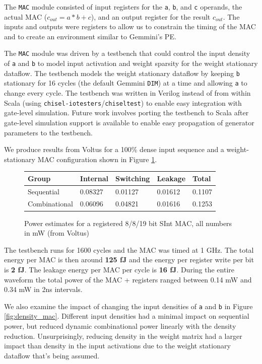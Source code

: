 \documentclass[sigconf]{acmart}
\begin{document}
The \texttt{MAC} module consisted of input registers for the \texttt{a}, \texttt{b}, and \texttt{c} operands, the actual MAC ($c_{out} = a*b + c$), and an output register for the result $c_{out}$.
The inputs and outputs were registers to allow us to constrain the timing of the MAC and to create an environment similar to Gemmini's PE.

The \texttt{MAC} module was driven by a testbench that could control the input density of \texttt{a} and \texttt{b} to model input activation and weight sparsity for the weight stationary dataflow.
The testbench models the weight stationary dataflow by keeping \texttt{b} stationary for 16 cycles (the default Gemmini \texttt{DIM}) at a time and allowing \texttt{a} to change every cycle.
The testbench was written in Verilog instead of from within Scala (using \texttt{chisel-iotesters}/\texttt{chiseltest}) to enable easy integration with gate-level simulation.
Future work involves porting the testbench to Scala after gate-level simulation support is available to enable easy propagation of generator parameters to the testbench.

We produce results from Voltus for a 100\% dense input sequence and a weight-stationary MAC configuration shown in Figure \ref{fig:mac_energy}.

\begin{figure}
\begin{tabular}{l l l l l}
  \toprule
  \textbf{Group} & \textbf{Internal} & \textbf{Switching} & \textbf{Leakage} & \textbf{Total} \\ \midrule
  Sequential & 0.08327 & 0.01127 & 0.01612 & 0.1107 \\
  Combinational & 0.06096 & 0.04821 & 0.01616 & 0.1253 \\
  \bottomrule
\end{tabular}
\caption{Power estimates for a registered 8/8/19 bit SInt MAC, all numbers in mW (from Voltus)}
\label{fig:mac_energy}
\end{figure}

The testbench runs for 1600 cycles and the MAC was timed at 1 GHz.
The total energy per MAC is then around \textbf{125 fJ} and the energy per register write per bit is \textbf{2 fJ}.
The leakage energy per MAC per cycle is \textbf{16 fJ}.
During the entire waveform the total power of the MAC + registers ranged between 0.14 mW and 0.34 mW in 2ns intervals.

We also examine the impact of changing the input densities of \texttt{a} and \texttt{b} in Figure \ref{fig:density_mac}.
Different input densities had a minimal impact on sequential power, but reduced dynamic combinational power linearly with the density reduction.
Unsurprisingly, reducing density in the weight matrix had a larger impact than density in the input activations due to the weight stationary dataflow that's being assumed.
\end{document}
